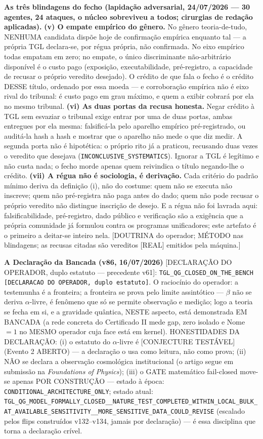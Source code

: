 \documentclass[11pt]{article}
\theoremstyle{definition}\newtheorem{deriv}{Derivação}
\begin{document}
\textbf{As três blindagens do fecho (lapidação adversarial, 24/07/2026 --- 30 agentes, 24 ataques, o núcleo sobreviveu a todos; cirurgias de redação aplicadas).} \textbf{(v) O empate empírico do gênero.} No gênero teoria-de-tudo, NENHUMA candidata dispõe hoje de confirmação empírica enquanto tal --- a própria TGL declara-se, por régua própria, não confirmada. No eixo empírico todas empatam em zero; no empate, o único discriminante não-arbitrário disponível é o custo pago (exposição, executabilidade, pré-registro, a capacidade de recusar o próprio veredito desejado). O crédito de que fala o fecho é o crédito DESSE título, ordenado por essa moeda --- e corroboração empírica não é eixo rival do tribunal: é custo pago em grau máximo, e quem a exibir cobrará por ela no mesmo tribunal. \textbf{(vi) As duas portas da recusa honesta.} Negar crédito à TGL sem esvaziar o tribunal exige entrar por uma de duas portas, ambas entregues por ela mesma: falsificá-la pelo aparelho empírico pré-registrado, ou auditá-la hash a hash e mostrar que o aparelho não mede o que diz medir. A segunda porta não é hipotética: o próprio rito já a praticou, recusando duas vezes o veredito que desejava (\texttt{INCONCLUSIVE\_SYSTEMATICS}). Ignorar a TGL é legítimo e não custa nada; o fecho morde apenas quem reivindica o título negando-lhe o crédito. \textbf{(vii) A régua não é sociologia, é derivação.} Cada critério do padrão mínimo deriva da definição (i), não do costume: quem não se executa não inscreve; quem não pré-registra não paga antes do dado; quem não pode recusar o próprio veredito não distingue inscrição de desejo. E a régua não foi lavrada aqui: falsificabilidade, pré-registro, dado público e verificação são a exigência que a própria comunidade já formulou contra os programas unificadores; este artefato é o primeiro a deitar-se inteiro nela. [DOUTRINA do operador; MÉTODO nas blindagens; as recusas citadas são vereditos [REAL] emitidos pela máquina.]

\textbf{A Declaração da Bancada (v86, 16/07/2026)} [DECLARAÇÃO DO OPERADOR, duplo estatuto --- precedente v61]: \texttt{TGL\_QG\_CLOSED\_ON\_THE\_BENCH [DECLARACAO DO OPERADOR, duplo estatuto]}. O raciocínio do operador: a testemunha é a fronteira; a fronteira se prova pelo limite assintótico --- $\beta$ não se deriva $\alpha$-livre, é fenômeno que só se permite observação e medição; logo a teoria se fecha em si, e a gravidade quântica, NESTE aspecto, está demonstrada EM BANCADA (a rede concreta do Certificado II mede gap, zero isolado e Nome $=1$ no MESMO operador cuja face está em kernel). HONESTIDADES DA DECLARAÇÃO: (i) o estatuto do $\alpha$-livre é [CONJECTURE TESTÁVEL] (Evento 2 ABERTO) --- a declaração o usa como leitura, não como prova; (ii) NÃO se declara a observação cosmológica institucional (o artigo segue em submissão na \emph{Foundations of Physics}); (iii) o GATE matemático fail-closed move-se apenas POR CONSTRUÇÃO --- estado à época: \texttt{CONDITIONAL\_ARCHITECTURE\_ONLY}; estado atual: \texttt{TGL\_QG\_MODEL\_FORMALLY\_CLOSED\_\_NATURE\_TEST\_COMPLETED\_WITHIN\_LOCAL\_BULK\_AT\_AVAILABLE\_SENSITIVITY\_\_MORE\_SENSITIVE\_DATA\_COULD\_REVISE} (escalado pelos flips construídos v132--v134, jamais por declaração) --- é essa disciplina que torna a declaração crível.
\end{document}
